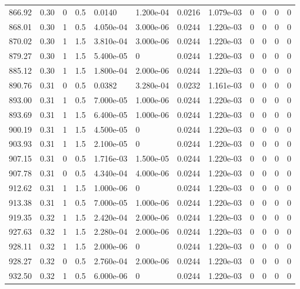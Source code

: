 \documentclass[preview]{standalone}
\begin{document}
{{{{{{\begin{tabular}{L{1.2cm}C{1.2cm} C{0.3cm}C{0.5cm} C{1.4cm}C{1.4cm} C{1.4cm}C{1.4cm} C{1.6cm}C{1.6cm} C{1.6cm}C{1.6cm}}
  866.92  &  0.30  & 0     & 0.5 &  0.0140  & 1.200e-04  &  0.0216&   1.079e-03& 0 & 0   &  0 & 0  \\ 
  868.01  &  0.30  & 1     & 0.5 &  4.050e-04  & 3.000e-06  &  0.0244&   1.220e-03& 0 & 0   &  0 & 0  \\ 
  870.02  &  0.30  & 1     & 1.5 &  3.810e-04  & 3.000e-06  &  0.0244&   1.220e-03& 0 & 0   &  0 & 0  \\ 
  879.27  &  0.30  & 1     & 1.5 &  5.400e-05  & 0  &  0.0244&   1.220e-03& 0 & 0   &  0 & 0  \\ 
  885.12  &  0.30  & 1     & 1.5 &  1.800e-04  & 2.000e-06  &  0.0244&   1.220e-03& 0 & 0   &  0 & 0  \\ 
  890.76  &  0.31  & 0     & 0.5 &  0.0382  & 3.280e-04  &  0.0232&   1.161e-03& 0 & 0   &  0 & 0  \\ 
  893.00  &  0.31  & 1     & 0.5 &  7.000e-05  & 1.000e-06  &  0.0244&   1.220e-03& 0 & 0   &  0 & 0  \\ 
  893.69  &  0.31  & 1     & 1.5 &  6.400e-05  & 1.000e-06  &  0.0244&   1.220e-03& 0 & 0   &  0 & 0  \\ 
  900.19  &  0.31  & 1     & 1.5 &  4.500e-05  & 0  &  0.0244&   1.220e-03& 0 & 0   &  0 & 0  \\ 
  903.93  &  0.31  & 1     & 1.5 &  2.100e-05  & 0  &  0.0244&   1.220e-03& 0 & 0   &  0 & 0  \\ 
  907.15  &  0.31  & 0     & 0.5 &  1.716e-03  & 1.500e-05  &  0.0244&   1.220e-03& 0 & 0   &  0 & 0  \\ 
  907.78  &  0.31  & 0     & 0.5 &  4.340e-04  & 4.000e-06  &  0.0244&   1.220e-03& 0 & 0   &  0 & 0  \\ 
  912.62  &  0.31  & 1     & 1.5 &  1.000e-06  & 0  &  0.0244&   1.220e-03& 0 & 0   &  0 & 0  \\ 
  913.38  &  0.31  & 1     & 0.5 &  7.000e-05  & 1.000e-06  &  0.0244&   1.220e-03& 0 & 0   &  0 & 0  \\ 
  919.35  &  0.32  & 1     & 1.5 &  2.420e-04  & 2.000e-06  &  0.0244&   1.220e-03& 0 & 0   &  0 & 0  \\ 
  927.63  &  0.32  & 1     & 1.5 &  2.280e-04  & 2.000e-06  &  0.0244&   1.220e-03& 0 & 0   &  0 & 0  \\ 
  928.11  &  0.32  & 1     & 1.5 &  2.000e-06  & 0  &  0.0244&   1.220e-03& 0 & 0   &  0 & 0  \\ 
  928.27  &  0.32  & 0     & 0.5 &  2.760e-04  & 2.000e-06  &  0.0244&   1.220e-03& 0 & 0   &  0 & 0  \\ 
  932.50  &  0.32  & 1     & 0.5 &  6.000e-06  & 0  &  0.0244&   1.220e-03& 0 & 0   &  0 & 0  \\ 

\end{tabular}}}}}}}
\end{document}
